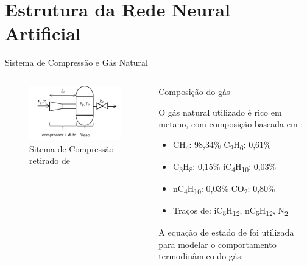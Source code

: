 \section{Estrutura da Rede Neural Artificial}

\begin{frame}{Sistema de Compressão e Gás Natural}
    \begin{columns}[T] %
        \begin{column}{0.48\textwidth}
        \begin{figure}
            \centering
            \includegraphics[width=1.1\linewidth]{figures/compressao.png}
            \caption{Sitema de Compressão retirado de \cite{Meira2022}}
            \label{fig:enter-label}
        \end{figure}
        \end{column}

        \begin{column}{0.52\textwidth}
            \scriptsize
        \begin{block}{Composição do gás}
                
            O gás natural utilizado é rico em metano, com composição baseada em \cite{Chaczykowski2009}:
            
            \vspace{0.12cm}
            \begin{itemize}  
                \item CH\textsubscript{4}: 98,34\% \quad C\textsubscript{2}H\textsubscript{6}: 0,61\%
                \item C\textsubscript{3}H\textsubscript{8}: 0,15\% \quad iC\textsubscript{4}H\textsubscript{10}: 0,03\%
                \item nC\textsubscript{4}H\textsubscript{10}: 0,03\% \quad CO\textsubscript{2}: 0,80\%
                \item Traços de: iC\textsubscript{5}H\textsubscript{12}, nC\textsubscript{5}H\textsubscript{12}, N\textsubscript{2}
            \end{itemize}
        \end{block}
            \vspace{0.1cm}
            A equação de estado de \cite{Meira2022} foi utilizada para modelar o comportamento termodinâmico do gás:


\end{column}
\end{columns}
\end{frame}
